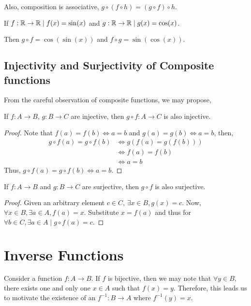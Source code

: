 Also, composition is associative, \(g \circ (f \circ h) = (g \circ f) \circ h\). 

\begin{example}
    If \(f : \mathbb R \to \mathbb R \mid f(x) = \sin(x)\) and \(g : \mathbb R \to \mathbb R \mid g(x) = \cos(x)\).

    Then \(g \circ f = \cos(\sin(x))\) and \(f \circ g = \sin(\cos(x))\). 
\end{example}

\subsection{Injectivity and Surjectivity of Composite functions}

From the careful observation of composite functions, we may propose,

\begin{proposition}
    If \(f : A \to B\), \(g : B \to C\) are injective, then \(g \circ f : A \to C\) is also injective.
\end{proposition}

\begin{proof}
    Note that \(f(a) = f(b) \iff a = b\) and \(g(a) = g(b) \iff a = b\), then,
    \begin{align*}
        g \circ f (a) = g \circ f(b) &\iff g(f(a) = g(f(b)))\\
        &\iff f(a) = f(b) \\
        & \iff a = b 
    \end{align*}  
    Thus, \(g \circ f (a) = g \circ f (b) \iff a = b\).  
\end{proof}

\begin{proposition}
    If \(f : A \to B\) and \(g : B \to C\) are surjective, then \(g \circ f \) is also surjective.
\end{proposition}

\begin{proof}
    Given an arbitrary element \(c \in C\), \(\exists x \in B, g(x) = c\). Now,
    \(\forall x \in B, \exists a \in A, f(a) = x\). Substitute \(x = f(a)\) and thus
    for \(\forall b \in C, \exists a \in A \mid g \circ f (a) = c\).
\end{proof}

\section{Inverse Functions}

Consider a function \(f : A \to B\). If \(f\) is bijective,
then we may note that \(\forall y \in B\), there exists one and only one
\(x \in A\) such that \(f(x) = y\). Therefore,
this leads us to motivate the existence of an 
\(f^{-1} : B \to A\) where \(f^{-1}(y) = x\). 

